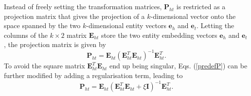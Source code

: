 \documentclass[9pt]{sig-alternate-05-2015}
\begin{document}
 Instead of freely setting the transformation matrices, $\textbf{P}_{ht}$ is restricted as a projection matrix that  gives the projection of a $k$-dimensional vector onto the space spanned by the two $k$-dimensional entity vectors $\bm{e}_h$ and $\bm{e}_t$.  Letting the columns of the $k\times 2$ matrix $\textbf{E}_{ht}$ store the two entity embedding vectors $\bm{e}_h $ and $\bm{e}_t$, the projection matrix is given by 
\begin{equation} \label{predefP}
\textbf{P}_{ht}=\textbf{E}_{ht}\left(\textbf{E}_{ht}^T \textbf{E}_{ht} \right)^{-1}\textbf{E}_{ht}^T.
\end{equation}
To avoid the square matrix $\textbf{E}_{ht}^T \textbf{E}_{ht}$ end up being singular,  Eqs. (\ref{predefP}) can be further modified by adding a  regularisation term, leading to
\begin{equation}
\textbf{P}_{ht}=\textbf{E}_{ht}\left(\textbf{E}_{ht}^T \textbf{E}_{ht} +\xi\textbf{I}\right)^{-1}\textbf{E}_{ht}^T.
\end{equation}
\end{document}
